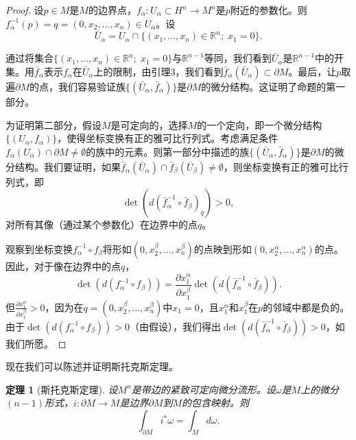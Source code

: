 \documentclass[12pt,a4paper]{ctexbook}
\newtheorem{theorem}{定理}[chapter]
\begin{document}
\begin{proof}
设$p\in M$是$M$的边界点，$f_\alpha:U_\alpha\subset H^n\to M^n$是$p$附近的参数化。则$f_\alpha^{-1}(p)=q=(0,x_2,\ldots,x_n)\in U_\alpha$。设
$$\bar{U}_\alpha = U_\alpha \cap \{(x_1,\ldots,x_n)\in\mathbb{R}^n;\; x_1=0\}.$$

通过将集合$\{(x_1,\ldots,x_n)\in\mathbb{R}^n;\; x_1=0\}$与$\mathbb{R}^{n-1}$等同，我们看到$\bar{U}_\alpha$是$\mathbb{R}^{n-1}$中的开集。用$\bar{f}_\alpha$表示$f_\alpha$在$\bar{U}_\alpha$上的限制，由引理3，我们看到$\bar{f}_\alpha(\bar{U}_\alpha)\subset\partial M$。最后，让$p$取遍$\partial M$的点，我们容易验证族$\{(\bar{U}_\alpha,\bar{f}_\alpha)\}$是$\partial M$的微分结构。这证明了命题的第一部分。

为证明第二部分，假设$M$是可定向的，选择$M$的一个定向，即一个微分结构$\{(U_\alpha,f_\alpha)\}$，使得坐标变换有正的雅可比行列式。考虑满足条件$f_\alpha(U_\alpha)\cap\partial M\neq\emptyset$的族中的元素。则第一部分中描述的族$\{(\bar{U}_\alpha,\bar{f}_\alpha)\}$是$\partial M$的微分结构。我们要证明，如果$\bar{f}_\alpha(\bar{U}_\alpha)\cap\bar{f}_\beta(\bar{U}_\beta)\neq\emptyset$，则坐标变换有正的雅可比行列式，即
$$\det(d(\bar{f}_\alpha^{-1}\circ \bar{f}_\beta)_q) > 0,$$
对所有其像（通过某个参数化）在边界中的点$q$。

观察到坐标变换$f_\alpha^{-1}\circ f_\beta$将形如$(0,x_2^\beta,\ldots,x_n^\beta)$的点映到形如$(0,x_2^\alpha,\ldots,x_n^\alpha)$的点。因此，对于像在边界中的点$q$，
$$\det(d(f_\alpha^{-1}\circ f_\beta)) = \frac{\partial x_1^\alpha}{\partial x_1^\beta} \det(d(\bar{f}_\alpha^{-1}\circ \bar{f}_\beta)).$$
但$\frac{\partial x_1^\alpha}{\partial x_1^\beta} > 0$，因为在$q=(0,x_2^\beta,\ldots,x_n^\beta)$中$x_1=0$，且$x_1^\alpha$和$x_1^\beta$在$p$的邻域中都是负的。由于$\det(d(f_\alpha^{-1}\circ f_\beta))>0$（由假设），我们得出$\det(d(\bar{f}_\alpha^{-1}\circ \bar{f}_\beta))>0$，如我们所愿。
\end{proof}

现在我们可以陈述并证明斯托克斯定理。

\begin{theorem}[斯托克斯定理]
设$M^n$是带边的紧致可定向微分流形。设$\omega$是$M$上的微分$(n-1)$形式，$i:\partial M\to M$是边界$\partial M$到$M$的包含映射。则
$$\int_{\partial M} i^*\omega = \int_M d\omega.$$
\end{theorem}
\end{document}

